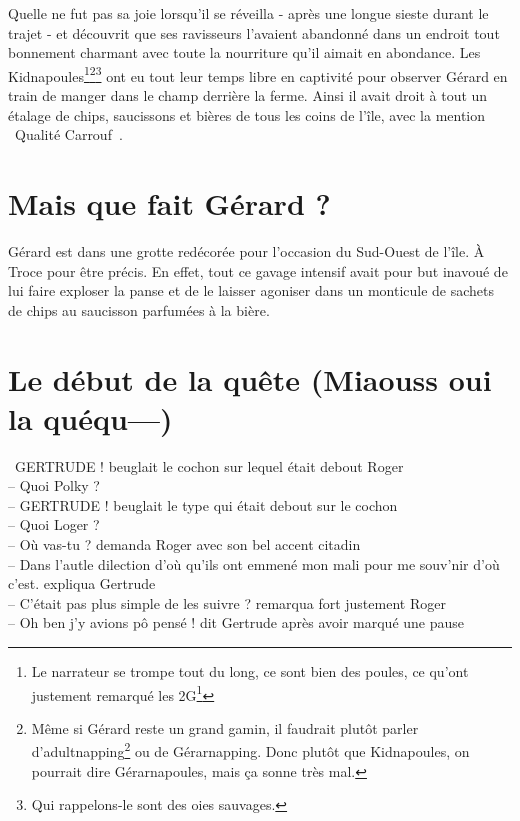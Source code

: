 \documentclass[a5paper, 10pt, twoside]{book}
\newcommand{\cg}{\guillemotleft~}
\newcommand{\cd}{~\guillemotright}
\begin{document}
Quelle ne fut pas sa joie lorsqu'il se réveilla - après une longue sieste durant le trajet - et découvrit que ses ravisseurs l'avaient abandonné dans un endroit tout bonnement charmant avec toute la nourriture qu'il aimait en abondance. Les Kidnapoules\footnote{Le narrateur se trompe tout du long, ce sont bien des poules, ce qu'ont justement remarqué les 2G\footnote{Les 2G est le surnom du couple formé par Gérard et Gertrude}}\footnote{Même si Gérard reste un grand gamin, il faudrait plutôt parler d'adultnapping\footnote{Ce mot n'existe pas officiellement\footnote{L'auteur s'est renseigné sur le sujet avant d'un informer le narrateur.}} ou de Gérarnapping. Donc plutôt que Kidnapoules, on pourrait dire Gérarnapoules, mais ça sonne très mal.}\footnote{Qui rappelons-le sont des oies sauvages.} ont eu tout leur temps libre en captivité pour observer Gérard en train de manger dans le champ derrière la ferme. Ainsi il avait droit à tout un étalage de chips, saucissons et bières de tous les coins de l'île, avec la mention \cg Qualité Carrouf\cd.

\section{Mais que fait Gérard ?}
Gérard est dans une grotte redécorée pour l'occasion du Sud-Ouest de l'île. À Troce pour être précis. En effet, tout ce gavage intensif avait pour but inavoué de lui faire exploser la panse et de le laisser agoniser dans un monticule de sachets de chips au saucisson parfumées à la bière.

\section[Le début de la quête]{Le début de la quête (Miaouss oui la quéqu---)}
\cg GERTRUDE ! beuglait le cochon sur lequel était debout Roger\\
-- Quoi Polky ?\\
-- GERTRUDE ! beuglait le type qui était debout sur le cochon\\
-- Quoi Loger ?\\
-- Où vas-tu ? demanda Roger avec son bel accent citadin\\
-- Dans l'autle dilection d'où qu'ils ont emmené mon mali pour me souv'nir d'où c'est. expliqua Gertrude\\
-- C'était pas plus simple de les suivre ? remarqua fort justement Roger\\
-- Oh ben j'y avions pô pensé ! dit Gertrude après avoir marqué une pause\cd
\end{document}
